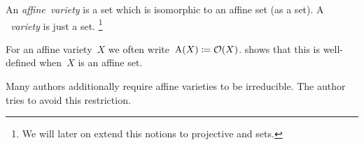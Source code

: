 \begin{definition}
  An \emph{affine~variety} is a {\qaffine} set which is isomorphic to an affine set (as a {\qaffine} set).
  A \emph{{\qaffine}~variety} is just a {\qaffine} set.%
  \footnote{We will later on extend this notions to projective and {\qprojective} sets.}
\end{definition}


\begin{notation}
  For an affine variety~$X$ we often write~$\operatorname{A}(X) \coloneqq \mathcal{O}(X)$.
   shows that this is well-defined when~$X$ is an affine set.
\end{notation}


\begin{remark}
  Many authors additionally require affine varieties to be irreducible.
  The author tries to avoid this restriction.
\end{remark}


